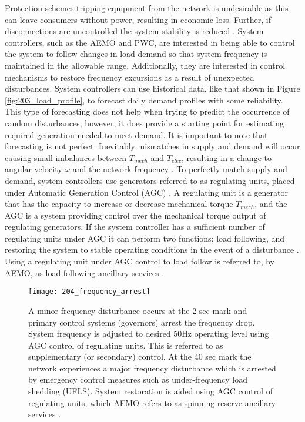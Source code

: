 Protection schemes tripping equipment from the network is undesirable as this can leave consumers without power, resulting in economic loss. Further, if disconnections are uncontrolled the system stability is reduced \cite{AEMOpowerfreqriskrev}. System controllers, such as the AEMO and PWC, are interested in being able to control the system to follow changes in load demand so that system frequency is maintained in the allowable range. Additionally, they are interested in control mechanisms to restore frequency excursions as a result of unexpected disturbances. System controllers can use historical data, like that shown in Figure \ref{fig:203_load_profile}, to forecast daily demand profiles with some reliability. This type of forecasting does not help when trying to predict the occurrence of random disturbances; however, it does provide a starting point for estimating required generation needed to meet demand. It is important to note that forecasting is not perfect. Inevitably mismatches in supply and demand will occur causing small imbalances between $T_{mech}$ and $T_{elec}$, resulting in a change to angular velocity $\omega$ and the network frequency \cite{Glover2012}. To perfectly match supply and demand, system controllers use generators referred to as regulating units, placed under Automatic Generation Control (AGC) \cite{Kothari2011}. A regulating unit is a generator that has the capacity to increase or decrease mechanical torque $T_{mech}$, and the AGC is a system providing control over the mechanical torque output of regulating generators. If the system controller has a sufficient number of regulating units under AGC it can perform two functions: load following, and restoring the system to stable operating conditions in the event of a disturbance \cite{Grainger1994}. Using a regulating unit under AGC control to load follow is referred to, by AEMO, as load following ancillary services \cite{AEMOancilliaryserv}.

\begin{figure}[ht]
\centering
\texttt{[image: 204\_frequency\_arrest]}
\caption[Frequency profiles of differing disturbance types]{A minor frequency disturbance occurs at the 2 sec mark and primary control systems (governors) arrest the frequency drop. System frequency is adjusted to desired 50$\si{\hertz}$ operating level using AGC control of regulating units. This is referred to as supplementary (or secondary) control. At the 40 sec mark the network experiences a major frequency disturbance which is arrested by emergency control measures such as under-frequency load shedding (UFLS). System restoration is aided using AGC control of regulating units, which AEMO refers to as spinning reserve ancillary services \cite{Bevrani2011}.}
\label{fig:204_frequency_arrest}
\end{figure}

